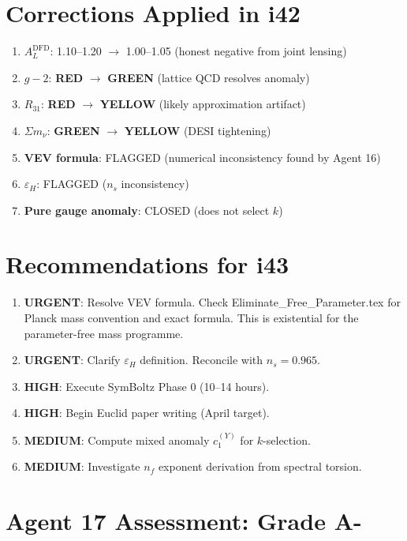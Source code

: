 \documentclass[11pt,a4paper]{article}
\newcommand{\GREEN}{\textcolor{dfdgreen}{\textbf{GREEN}}}
\newcommand{\YELLOW}{\textcolor{dfdyellow}{\textbf{YELLOW}}}
\newcommand{\RED}{\textcolor{dfdred}{\textbf{RED}}}
\begin{document}
\section{Corrections Applied in i42}

\begin{enumerate}
\item \textbf{$A_L^{\text{DFD}}$}: 1.10--1.20 $\to$ 1.00--1.05 (honest negative from joint lensing)
\item \textbf{$g-2$}: \RED{} $\to$ \GREEN{} (lattice QCD resolves anomaly)
\item \textbf{$R_{31}$}: \RED{} $\to$ \YELLOW{} (likely approximation artifact)
\item \textbf{$\Sigma m_\nu$}: \GREEN{} $\to$ \YELLOW{} (DESI tightening)
\item \textbf{VEV formula}: FLAGGED (numerical inconsistency found by Agent 16)
\item \textbf{$\varepsilon_H$}: FLAGGED ($n_s$ inconsistency)
\item \textbf{Pure gauge anomaly}: CLOSED (does not select $k$)
\end{enumerate}

\section{Recommendations for i43}

\begin{enumerate}
\item \textbf{URGENT}: Resolve VEV formula. Check Eliminate\_Free\_Parameter.tex for Planck mass convention and exact formula. This is existential for the parameter-free mass programme.
\item \textbf{URGENT}: Clarify $\varepsilon_H$ definition. Reconcile with $n_s = 0.965$.
\item \textbf{HIGH}: Execute SymBoltz Phase 0 (10--14 hours).
\item \textbf{HIGH}: Begin Euclid paper writing (April target).
\item \textbf{MEDIUM}: Compute mixed anomaly $c_1^{(Y)}$ for $k$-selection.
\item \textbf{MEDIUM}: Investigate $n_f$ exponent derivation from spectral torsion.
\end{enumerate}

\section{Agent 17 Assessment: Grade A-}
\end{document}
